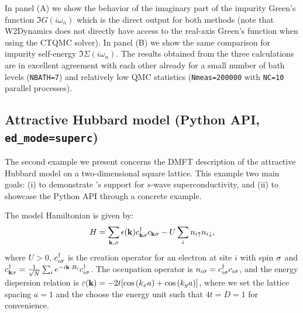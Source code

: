 \documentclass[edipack_sp.tex]{subfiles}
\begin{document}
In panel (A) we show the behavior of the imaginary part of the impurity Green's function $\Im{G}(i\omega_n)$ which is the direct output for both methods (note that W2Dynamics does not directly have access to the real-axis Green's function when using the CTQMC solver). In panel (B) we show the same comparison for impurity self-energy $\Im{\Sigma}(i\omega_n)$. 
The results obtained from the three calculations are in excellent agreement with each other already for a small number of bath levels ({\tt NBATH=7}) and relatively low QMC statistics ({\tt Nmeas=200000} with {\tt NC=10} parallel processes).   



















\subsection{Attractive Hubbard model (Python API, {\tt ed\_mode=superc})}\label{SecExamplesAHM}
The second example we present concerns the DMFT description of the 
attractive Hubbard model \cite{Caffarel1994PRL,Toschi2005NJP,Toschi2005PRB} on a two-dimensional square lattice. 
This  example two main goals: (i) to demonstrate \NAME's support for $s$-wave superconductivity, and (ii) to showcase the Python API through a concrete example. 

The 
model Hamiltonian is given by:
$$
H = \sum_{{\bf k},\sigma} \epsilon({\bf k}) c^\dagger_{{\bf k}\sigma} c_{{\bf k}\sigma} 
    - U \sum_i n_{i\uparrow} n_{i\downarrow},
$$
where $U > 0$, $c^\dagger_{i\sigma}$ 
is the creation operator for an electron at site $i$ with spin $\sigma$ and $c^\dagger_{{\bf k}\sigma} = \tfrac{1}{\sqrt{N}} 
\sum_i e^{-i{\bf k} \cdot R_i} c^\dagger_{i\sigma}$. 
The occupation operator is $n_{i\sigma} = c^\dagger_{i\sigma} c_{i\sigma}$, and 
the energy dispersion relation is $\varepsilon({\bf k})=-2t[\cos{(k_x a)}+
\cos{(k_y a)}]$, where we set the lattice spacing 
$a=1$  and the choose the energy unit such that $4t=D=1$ for convenience.
\end{document}
